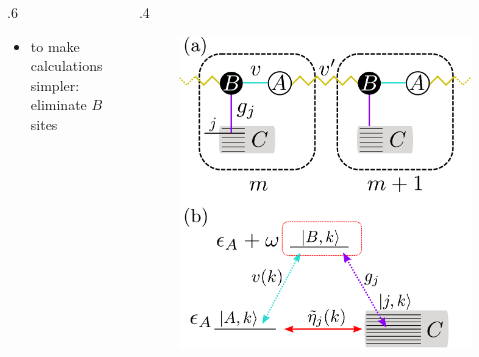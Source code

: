 \documentclass[10pt, aspectratio=169]{beamer}
\begin{document}
\begin{frame}
\begin{columns}
\begin{column}{.6\linewidth}
\begin{itemize}
{\begin{align*}
                   \\
                   V(k)&=\abs{v(k)}\pqty{\eu^{\iu ϕ(k)}\ketbra{A,k}{B,k} + \hc}
                 \end{align*}
               }
             \item<4-> to make calculations simpler: eliminate \(B\) sites
      \end{itemize}
    \end{column}
    \begin{column}{.4\linewidth}
      \begin{figure}
        \centering
        \includegraphics[width=\columnwidth]{figs/fig1.pdf}
      \end{figure}
    \end{column}
  \end{columns}
\end{frame}
\end{document}

